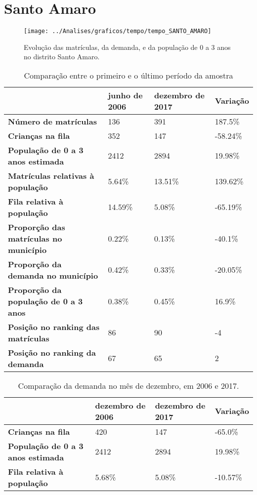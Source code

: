 \section{Santo Amaro}
\begin{figure}[H]
\centering
\texttt{[image: ../Analises/graficos/tempo/tempo\_SANTO\_AMARO]}
\caption{Evolução das matrículas, da demanda, e da população de 0 a 3 anos no distrito Santo Amaro.}
\end{figure}
\begin{table}[H]
\begin{tabular}{|l|l|l|l|}
\hline
\textbf{}                                      & \textbf{junho de 2006}       & \textbf{dezembro de 2017}    & \textbf{Variação} \\ \hline
\textbf{Número de matrículas}                  & 136 & 391 & 187.5\% \\ \hline
\textbf{Crianças na fila}                      & 352 & 147 & -58.24\% \\ \hline
\textbf{População de 0 a 3 anos estimada}      & 2412 & 2894 & 19.98\% \\ \hline
\textbf{Matrículas relativas à população}      & 5.64\% & 13.51\% & 139.62\% \\ \hline
\textbf{Fila relativa à população}             & 14.59\% & 5.08\% & -65.19\% \\ \hline
\textbf{Proporção das matrículas no município} & 0.22\% & 0.13\% & -40.1\% \\ \hline
\textbf{Proporção da demanda no município}     & 0.42\% & 0.33\% & -20.05\% \\ \hline
\textbf{Proporção da população de 0 a 3 anos}  & 0.38\% & 0.45\% & 16.9\% \\ \hline
\textbf{Posição no ranking das matrículas}     & 86 & 90 & -4 \\ \hline
\textbf{Posição no ranking da demanda}         & 67 & 65 & 2 \\ \hline
\end{tabular}
\caption{Comparação entre o primeiro e o último período da amostra}
\end{table}
\begin{table}[H]
\begin{tabular}{|l|l|l|l|}
\hline
\textbf{}                                 & \textbf{dezembro de 2006} & \textbf{dezembro de 2017} & \textbf{Variação} \\ \hline
\textbf{Crianças na fila}                      & 420 & 147 & -65.0\% \\ \hline
\textbf{População de 0 a 3 anos estimada}      & 2412 & 2894 & 19.98\% \\ \hline
\textbf{Fila relativa à população}             & 5.68\% & 5.08\% & -10.57\% \\ \hline
\end{tabular}
\caption{Comparação da demanda no mês de dezembro, em 2006 e 2017.}
\end{table}
